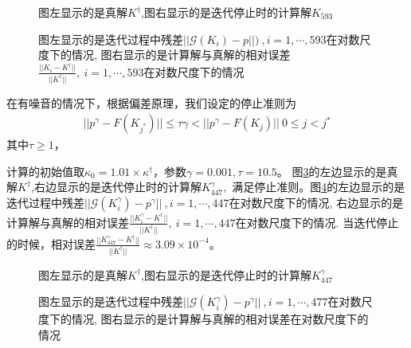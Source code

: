 \documentclass[a4paper,12pt,oneside,CJK]{cctbook}
\theoremstyle{definition}
\numberwithin{equation}{section}
\begin{document}
\begin{figure}
\caption{图左显示的是真解$K^{\dagger}$,图右显示的是迭代停止时的计算解$K_{593}$}\label{fig1}
\end{figure}

\begin{figure}
\caption{图左显示的是迭代过程中残差$||\mathcal{G}(K_i)-p||)~,i=1,\cdots,593$在对数尺度下的情况,
图右显示的是计算解与真解的相对误差$\frac{||K_i-K^{\dagger}||}{||K^{\dagger}||},~i=1,\cdots,593$在对数尺度下的情况}\label{fig2}
\end{figure}

在有噪音的情况下，根据偏差原理，我们设定的停止准则为
\begin{eqnarray}
   ||p^{\gamma}-F(K_{j^*})||\leq \tau \gamma < ||p^{\gamma}-F(K_j)||~0\leq j<j^*
\end{eqnarray}
其中$\tau\geq 1$，

计算的初始值取$\kappa_0=1.01\times\kappa^{\dagger}$，参数$\gamma=0.001,\tau=10.5$。
图\ref{fig3}的左边显示的是真解$K^{\dagger}$,右边显示的是迭代停止时的计算解$K^{\gamma}_{447},$
满足停止准则。图\ref{fig4}的左边显示的是迭代过程中残差$||\mathcal{G}(K^{\gamma}_i)-p^{\gamma}||~,i=1,\cdots,447$在对数尺度下的情况,
右边显示的是计算解与真解的相对误差$\frac{||K^{\gamma}_i-K^{\dagger}||}{||K^{\dagger}||},~i=1,\cdots,447$在对数尺度下的情况.
当迭代停止的时候，相对误差$\frac{||K^{\gamma}_{447}-K^{\dagger}||}{||K^{\dagger}||}\approx 3.09\times 10^{-4}$。

\begin{figure}
\caption{图左显示的是真解$K^{\dagger}$,图右显示的是迭代停止时的计算解$K^{\gamma}_{447}$}\label{fig3}
\end{figure}

\begin{figure}
\caption{图左显示的是迭代过程中残差$||\mathcal{G}(K^{\gamma}_i)-p^{\gamma}||~,i=1,\cdots,477$在对数尺度下的情况,
图右显示的是计算解与真解的相对误差在对数尺度下的情况}\label{fig4}
\end{figure}
\end{document}
